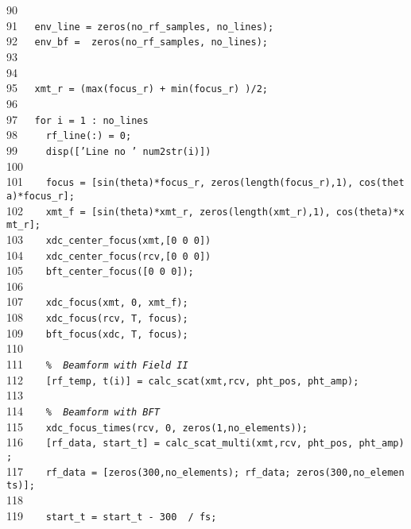 \documentclass{manual}
\begin{document}
{90{\tt~~~}{\tt }\\
91{\tt~~~}{\tt env\_line~=~zeros(no\_rf\_samples,~no\_lines);}\\
92{\tt~~~}{\tt env\_bf~=~~zeros(no\_rf\_samples,~no\_lines);}\\
93{\tt~~~}{\tt }\\
94{\tt~~~}{\tt }\\
95{\tt~~~}{\tt xmt\_r~=~(max(focus\_r)~+~min(focus\_r)~)/2;}\\
96{\tt~~~}{\tt }\\
97{\tt~~~}{\tt for~i~=~1~:~no\_lines}\\
98{\tt~~~}{\tt ~~rf\_line(:)~=~0;~~}\\
99{\tt~~~}{\tt ~~disp(['Line~no~'~num2str(i)])}\\
100{\tt~~}{\tt ~~}\\
101{\tt~~}{\tt ~~focus~=~[sin(theta)*focus\_r,~zeros(length(focus\_r),1),~cos(theta)*focus\_r];}\\
102{\tt~~}{\tt ~~xmt\_f~=~[sin(theta)*xmt\_r,~zeros(length(xmt\_r),1),~cos(theta)*xmt\_r];}\\
103{\tt~~}{\tt ~~xdc\_center\_focus(xmt,[0~0~0])}\\
104{\tt~~}{\tt ~~xdc\_center\_focus(rcv,[0~0~0])}\\
105{\tt~~}{\tt ~~bft\_center\_focus([0~0~0]);}\\
106{\tt~~}{\tt ~~}\\
107{\tt~~}{\tt ~~xdc\_focus(xmt,~0,~xmt\_f);}\\
108{\tt~~}{\tt ~~xdc\_focus(rcv,~T,~focus);}\\
109{\tt~~}{\tt ~~bft\_focus(xdc,~T,~focus);}\\
110{\tt~~}{\tt ~~}\\
111{\tt~~}{\tt ~~{\sl \%~~Beamform~with~Field~II}}\\
112{\tt~~}{\tt ~~[rf\_temp,~t(i)]~=~calc\_scat(xmt,rcv,~pht\_pos,~pht\_amp);}\\
113{\tt~~}{\tt ~~}\\
114{\tt~~}{\tt ~~{\sl \%~~Beamform~with~BFT}}\\
115{\tt~~}{\tt ~~xdc\_focus\_times(rcv,~0,~zeros(1,no\_elements));}\\
116{\tt~~}{\tt ~~[rf\_data,~start\_t]~=~calc\_scat\_multi(xmt,rcv,~pht\_pos,~pht\_amp);}\\
117{\tt~~}{\tt ~~rf\_data~=~[zeros(300,no\_elements);~rf\_data;~zeros(300,no\_elements)];}\\
118{\tt~~}{\tt }\\
119{\tt~~}{\tt ~~start\_t~=~start\_t~-~300~~/~fs;}\\
}
\end{document}
